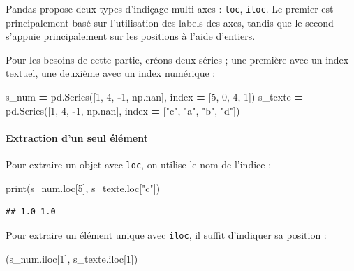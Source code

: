 \documentclass[12pt,]{book}
\newenvironment{Shaded}{\begin{snugshade}}{\end{snugshade}}
\newcommand{\DecValTok}[1]{\textcolor[rgb]{0.00,0.00,0.81}{#1}}
\newcommand{\StringTok}[1]{\textcolor[rgb]{0.31,0.60,0.02}{#1}}
\newcommand{\OperatorTok}[1]{\textcolor[rgb]{0.81,0.36,0.00}{\textbf{#1}}}
\newcommand{\BuiltInTok}[1]{#1}
\newcommand{\NormalTok}[1]{#1}
\let\oldparagraph\paragraph
\renewcommand{\paragraph}[1]{\oldparagraph{#1}\mbox{}}
\numberwithin{equation}{section}
\numberwithin{countremarque}{section}
\begin{document}
Pandas propose deux types d'indiçage multi-axes : \texttt{loc},
\texttt{iloc}. Le premier est principalement basé sur l'utilisation des
labels des axes, tandis que le second s'appuie principalement sur les
positions à l'aide d'entiers.

Pour les besoins de cette partie, créons deux séries ; une première avec
un index textuel, une deuxième avec un index numérique :

\begin{Shaded}
\begin{Highlighting}[]
\NormalTok{s_num }\OperatorTok{=}\NormalTok{ pd.Series([}\DecValTok{1}\NormalTok{, }\DecValTok{4}\NormalTok{, }\OperatorTok{-}\DecValTok{1}\NormalTok{, np.nan],}
\NormalTok{             index }\OperatorTok{=}\NormalTok{ [}\DecValTok{5}\NormalTok{, }\DecValTok{0}\NormalTok{, }\DecValTok{4}\NormalTok{, }\DecValTok{1}\NormalTok{])}
\NormalTok{s_texte }\OperatorTok{=}\NormalTok{ pd.Series([}\DecValTok{1}\NormalTok{, }\DecValTok{4}\NormalTok{, }\OperatorTok{-}\DecValTok{1}\NormalTok{, np.nan],}
\NormalTok{             index }\OperatorTok{=}\NormalTok{ [}\StringTok{"c"}\NormalTok{, }\StringTok{"a"}\NormalTok{, }\StringTok{"b"}\NormalTok{, }\StringTok{"d"}\NormalTok{])}
\end{Highlighting}
\end{Shaded}

\paragraph{Extraction d'un seul
élément}\label{extraction-dun-seul-element}

Pour extraire un objet avec \texttt{loc}, on utilise le nom de l'indice
:

\begin{Shaded}
\begin{Highlighting}[]
\BuiltInTok{print}\NormalTok{(s_num.loc[}\DecValTok{5}\NormalTok{], s_texte.loc[}\StringTok{"c"}\NormalTok{])}
\end{Highlighting}
\end{Shaded}

\begin{lstlisting}
## 1.0 1.0
\end{lstlisting}

Pour extraire un élément unique avec \texttt{iloc}, il suffit d'indiquer
sa position :

\begin{Shaded}
\begin{Highlighting}[]
\NormalTok{(s_num.iloc[}\DecValTok{1}\NormalTok{], s_texte.iloc[}\DecValTok{1}\NormalTok{])}
\end{Highlighting}
\end{Shaded}
\end{document}

